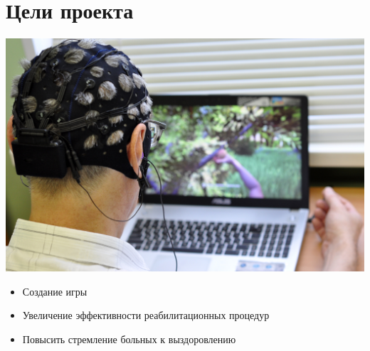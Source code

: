 \section{Цели проекта}

\begin{frame}
    
    \framesubtitle{\insertsubsection}
    
    \begin{minipage}[h]{0.4\linewidth}
        \includegraphics[width=\linewidth]{5.jpg}
    \end{minipage}
    \hfill 
    \begin{minipage}[h]{0.5\linewidth}
    \begin{itemize}
        \item Создание игры
        \item Увеличение эффективности реабилитационных процедур
        \item Повысить стремление больных к выздоровлению
    \end{itemize}
    \end{minipage}

\end{frame}